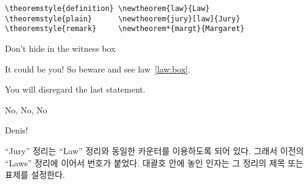 \begin{verbatim}
\theoremstyle{definition} \newtheorem{law}{Law}
\theoremstyle{plain}      \newtheorem{jury}[law]{Jury}
\theoremstyle{remark}     \newtheorem*{margt}{Margaret}
\end{verbatim}

\begin{example}
\begin{law} \label{law:box}
Don't hide in the witness box
\end{law}
\begin{jury}
It could be you! So beware and
see law~\ref{law:box}.\end{jury}
\begin{jury}
You will disregard the last
statement.\end{jury}
\begin{margt}No, No, No\end{margt}
\begin{margt}Denis!\end{margt}
\end{example}

``Jury'' 정리는 ``Law'' 정리와 동일한 카운터를 이용하도록 되어 있다.
그래서 이전의 ``Laws'' 정리에 이어서 번호가 붙었다.
대괄호 안에 놓인 인자는 그 정리의 제목 또는 표제를 설정한다.

